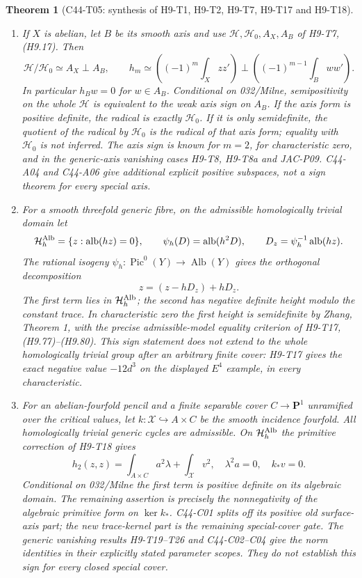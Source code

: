 \documentclass[11pt]{article}
\newtheorem{theorem}{Theorem}[section]
\theoremstyle{remark}\newtheorem{remark}[theorem]{Remark}
\DeclareMathOperator{\Pic}{Pic}
\DeclareMathOperator{\Alb}{Alb}
\begin{document}
\begin{theorem}[C44-T05: synthesis of H9-T1, H9-T2, H9-T7,
H9-T17 and H9-T18]
\begin{enumerate}
\item If $X$ is abelian, let $B$ be its smooth axis and use
$\mathcal H,\mathcal H_0,A_X,A_B$ of H9-T7, (H9.17). Then
\[
 \mathcal H/\mathcal H_0\simeq A_X\mathbin\perp A_B,
 \qquad h_m\simeq
 \left((-1)^m\int_Xzz'\right)\mathbin\perp
 \left((-1)^{m-1}\int_Bww'\right).
 \tag{C44.T05.3}
\]
In particular $h_Bw=0$ for $w\in A_B$. Conditional on 032/Milne,
semipositivity on the whole $\mathcal H$ is equivalent to the weak
axis sign on $A_B$. If the axis form is positive definite, the
radical is exactly $\mathcal H_0$. If it is only semidefinite,
the quotient of the radical by $\mathcal H_0$ is the radical of
that axis form; equality with $\mathcal H_0$ is not inferred.
The axis sign is known for $m=2$, for characteristic zero, and in
the generic-axis vanishing cases H9-T8, H9-T8a and JAC-P09.
C44-A04 and C44-A06 give additional explicit positive subspaces,
not a sign theorem for every special axis.

\item For a smooth threefold generic fibre, on the admissible
homologically trivial domain let
\[
 \mathcal H_h^{\rm Alb}=\{z:\operatorname{alb}(hz)=0\},\qquad
 \psi_h(D)=\operatorname{alb}(h^2D),\qquad
 D_z=\psi_h^{-1}\operatorname{alb}(hz).
\]
The rational isogeny $\psi_h:\Pic^0(Y)\to\Alb(Y)$ gives the
orthogonal decomposition
\[
                    z=(z-hD_z)+hD_z.
 \tag{C44.T05.4}
\]
The first term lies in $\mathcal H_h^{\rm Alb}$; the second has
negative definite height modulo the constant trace. In
characteristic zero the first height is semidefinite by Zhang,
Theorem 1, with the precise admissible-model equality criterion
of H9-T17, (H9.77)--(H9.80). This sign statement does not extend
to the whole homologically trivial group after an arbitrary
finite cover: H9-T17 gives the exact negative value $-12d^3$ on
the displayed $E^4$ example, in every characteristic.

\item For an abelian-fourfold pencil and a finite separable cover
$C\to\mathbf P^1$ unramified over the critical values, let
$k:\mathcal X\hookrightarrow A\times C$ be the smooth incidence
fourfold. All homologically trivial generic cycles are admissible.
On $\mathcal H_h^{\rm Alb}$ the primitive correction of H9-T18
gives
\[
              h_2(z,z)=\int_{A\times C}a^2\lambda
                              +\int_{\mathcal X}v^2,
 \quad \lambda^2a=0,\quad k_*v=0.
 \tag{C44.T05.5}
\]
Conditional on 032/Milne the first term is positive definite on
its algebraic domain. The remaining assertion is precisely the
nonnegativity of the algebraic primitive form on $\ker k_*$.
C44-C01 splits off its positive old surface-axis part; the new
trace-kernel part is the remaining special-cover gate. The
generic vanishing results H9-T19--T26 and C44-C02--C04 give
the norm identities in their explicitly stated parameter scopes.
They do not establish this sign for every closed special cover.
\end{enumerate}
\end{theorem}
\end{document}
